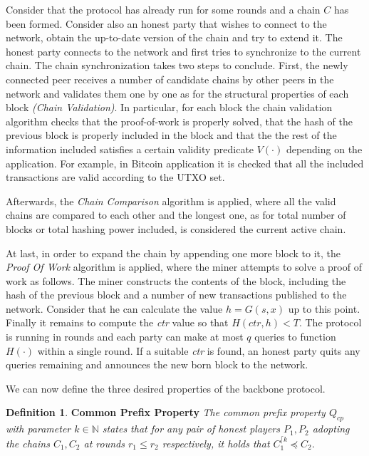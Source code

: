 \documentclass[10pt,a4paper]{article}
\theoremstyle{plain}
\theoremstyle{definition}
\newtheorem{defn}{Definition}
\theoremstyle{lemma}
\theoremstyle{corollary}
\begin{document}
Consider that the protocol has already run for some rounds and a chain $C$ has been formed. Consider
also an honest party that wishes to connect to the network, obtain the up-to-date version of the
chain and try to extend it.
The honest party connects to the network and first tries to synchronize to the current chain. The
chain synchronization takes two steps to conclude. First, the newly connected peer receives a number
of candidate chains by other peers in the network and validates them one by one as for the structural 
properties of each block \textit{(Chain Validation)}. In particular, for each block the chain
validation algorithm checks that the proof-of-work is properly solved, that the hash of the previous
block is properly included in the block and that the the rest of the information included satisfies
a certain validity predicate $V(\cdot)$ depending on the application. For example, in Bitcoin
application it is checked that all the included transactions are valid according to the
UTXO set.

Afterwards, the \textit{Chain Comparison} algorithm is applied, where all the valid chains are
compared to each other and the longest one, as for total number of blocks or total hashing power
included, is considered the current active chain.

At last, in order to expand the chain by appending one more block to it, the \textit{Proof Of Work}
algorithm is applied, where the miner attempts to solve a proof of work as follows. The miner
constructs the contents of the block, including the hash of the previous block and a number of new
transactions published to the network. Consider that he can calculate the value $h = G(s,x)$ up
to this point. Finally it remains to compute the \textit{ctr} value so that $H(ctr, h) < T$. The
protocol is running in rounds and each party can make at most $q$ queries to function $H(\cdot)$
within a single round. If a suitable \textit{ctr} is found, an honest party quits any queries
remaining and announces the new born block to the network.

We can now define the three desired properties of the backbone protocol.\\
\begin{defn}{\textbf{Common Prefix Property}}
	\textit{The common prefix property $Q_{cp}$ with parameter
$k \in \mathbb{N}$ states that for any pair of honest players $P_1, P_2$ adopting the chains
$C_1, C_2$ at rounds $r_1 \leq r_2$ respectively, it holds that $C_1^{\lceil k} \preceq C_2$.}
	\label{defn:common_prefix}
\end{defn}
\end{document}
